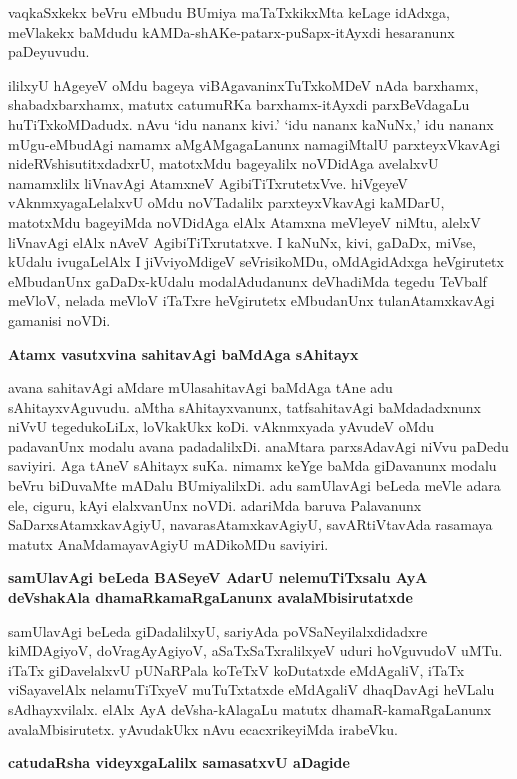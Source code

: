 vaqkaSxkekx beVru eMbudu BUmiya maTaTxkikxMta keLage idAdxga, meVlakekx baMdudu kAMDa-shAKe-patarx-puSapx-itAyxdi hesaranunx paDeyuvudu. 

ililxyU hAgeyeV oMdu bageya viBAgavaninxTuTxkoMDeV nAda barxhamx, shabadxbarxhamx, matutx catumuRKa barxhamx-itAyxdi parxBeVda\-gaLu huTiTxkoMDadudx. nAvu `idu nananx kivi.' `idu nananx kaNuNx,' idu nananx mUgu-eMbudAgi namamx\- aMgAMgagaLanunx namagiMtalU parxteyxVkavAgi nideRVshisutitxdadxrU, matotxMdu bageyalilx noVDi\-dAga avelalxvU namamxlilx liVnavAgi AtamxneV AgibiTiTxrutetxVve. hiVgeyeV vAknmxyagaLelalxvU oMdu noVTa\-dalilx parxteyxVkavAgi kaMDarU, matotxMdu bageyiMda noVDidAga elAlx Atamxna meVleyeV niMtu, alelxV liVnavAgi elAlx nAveV AgibiTiTxrutatxve. I kaNuNx, kivi, gaDaDx, miVse, kUdalu ivugaLelAlx I jiVvi\-yoMdigeV seVrisikoMDu, oMdAgidAdxga heVgirutetx eMbudanUnx gaDaDx-kUdalu modalAdudanunx deVhadiMda tegedu TeVbalf meVloV, nelada meVloV iTaTxre heVgirutetx eMbudanUnx tulanAtamxka\-vAgi gamanisi noVDi.

{\bigskip
\noindent
{\large\bf Atamx vasutxvina sahitavAgi baMdAga sAhitayx}}\label{196}
\medskip

\noindent
avana sahitavAgi aMdare mUlasahitavAgi baMdAga tAne adu sAhitayxvAgu\-vudu. aMtha sAhitayx\-vanunx, tatfsahitavAgi baMdadadxnunx niVvU tegedukoLiLx, loVkakUkx koDi. vAknmxyada yAvudeV oMdu padavanUnx modalu avana padadalilxDi. \hbox{anaMtara} parxsAdavAgi niVvu paDedu saviyiri. Aga tAneV sAhitayx\- suKa. nimamx keYge baMda giDavanunx modalu beVru biDuvaMte mADalu BUmiyalilxDi. adu samUla\-vAgi beLeda meVle adara ele, ciguru, kAyi elalxvanUnx noVDi. adariMda baruva Palavanunx SaDarxsAtamxka\-vAgiyU, navarasAtamxkavAgiyU, savARtiVtavAda rasamaya matutx AnaMdamayavAgiyU mADi\-koMDu saviyiri.

{\bigskip
\noindent
{\large\bf samUlavAgi beLeda BASeyeV AdarU nelemuTiTxsalu AyA deVshakAla dhamaRkamaRgaLanunx avalaMbisirutatxde}}\label{page196}
\medskip

\noindent
samUlavAgi beLeda giDadalilxyU, sariyAda poVSaNeyilalxdidadxre kiMDAgiyoV, doVragAyA\-giyoV, aSaTxSaTxralilxyeV uduri hoVguvudoV uMTu. iTaTx giDa\-velalxvU pUNaRPala koTeTxV koDu\-tatxde eMdAgaliV, iTaTx viSayavelAlx nela\break\-muTiTxyeV muTuTxtatxde eMdAgaliV dhaqDavAgi heVLalu sAdhayx\-vilalx. elAlx AyA deVsha-kAlagaLu matutx dhamaR-kamaRgaLanunx avalaMbisirutetx. yAvu\-dakUkx nAvu ecacxrikeyiMda irabeVku.

{\bigskip
\noindent
{\large\bf catudaRsha videyxgaLalilx samasatxvU aDagide}}\label{page197}
\medskip

